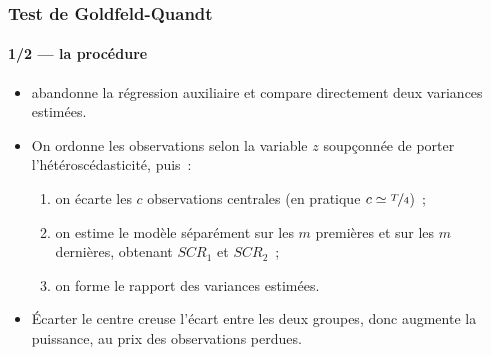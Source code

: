 \documentclass[10pt]{beamer}
\begin{document}
\begin{frame}
  \frametitle{Test de Goldfeld-Quandt}
  \framesubtitle{1/2 --- la procédure}

  \begin{itemize}

  \item \cite{GoldfeldQuandt1965} abandonne la régression auxiliaire et compare
    directement deux variances estimées.\newline

  \item On ordonne les observations selon la variable $z$ soupçonnée de porter
    l'hétéroscédasticité, puis~:
    \begin{enumerate}
    \item on écarte les $c$ observations centrales (en pratique $c\simeq
      \nicefrac{T}{4}$)~;
    \item on estime le modèle séparément sur les $m$ premières et sur les $m$
      dernières, obtenant $SCR_1$ et $SCR_2$~;
    \item on forme le rapport des variances estimées.
    \end{enumerate}

  \item Écarter le centre creuse l'écart entre les deux groupes, donc augmente
    la puissance, au prix des observations perdues.\newline

  \end{itemize}


\end{frame}
\end{document}
